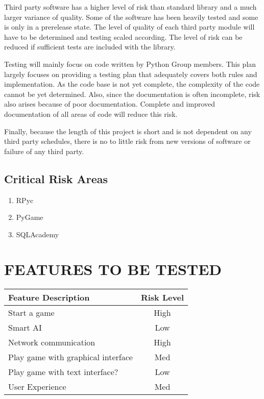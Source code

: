 \documentclass[report]{article}
\begin{document}
Third party software has a higher level of risk than standard library and a much larger variance of quality. Some of the software has been heavily tested and some is only in a prerelease state. The level of quality of each third party module will have to be determined and testing scaled according. The level of risk can be reduced if sufficient tests are included with the library.

Testing will mainly focus on code written by Python Group members. This plan largely focuses on providing a testing plan that adequately covers both rules and implementation. As the code base is not yet complete, the complexity of the code cannot be yet determined. Also, since the documentation is often incomplete, risk also arises because of poor documentation. Complete and improved documentation of all areas of code will reduce this risk.

Finally, because the length of this project is short and is not dependent on any third party schedules, there is no to little risk from new versions of software or failure of any third party.

\subsection{Critical Risk Areas}
\begin{enumerate}
\item RPyc
\item PyGame
\item SQLAcademy
\end{enumerate} 

\section[FEATURES TO BE TESTED]{FEATURES TO BE TESTED}
\begin{center}
\begin{tabularx}{\textwidth}{| X | c |}
  \hline
  \textbf{Feature Description} &
    \textbf{Risk Level} 
\\ \hline
Start a game & High
\\ \hline
Smart AI & Low
\\ \hline
Network communication & High
\\ \hline
Play game with graphical interface & Med
\\ \hline
Play game with text interface? & Low
\\ \hline
User Experience & Med
\\ \hline
\end{tabularx}
\end{center}
\end{document}
